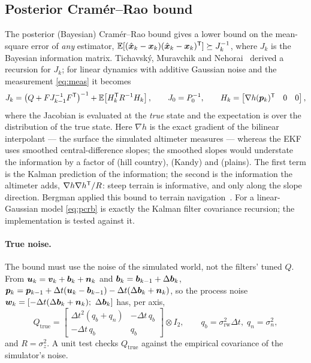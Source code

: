 \subsection{Posterior Cramér--Rao bound}\label{sec:pcrb}
The posterior (Bayesian) Cramér--Rao bound gives a lower bound on the mean-square error of
\emph{any} estimator, $\mathbb{E}[(\hat{\bm{x}}_k - \bm{x}_k)(\hat{\bm{x}}_k - \bm{x}_k)^{\mathsf{T}}] \succeq J_k^{-1}$, where $J_k$
is the Bayesian information matrix. Tichavsk\'y, Muravchik and Nehorai~\cite{tichavsky1998}
derived a recursion for $J_k$; for linear dynamics with additive Gaussian noise and the
measurement \eqref{eq:meas} it becomes
\begin{equation}
  J_k = \bigl(Q + F J_{k-1}^{-1} F^{\mathsf{T}}\bigr)^{-1} + \mathbb{E}\!\left[H_k^{\mathsf{T}} R^{-1} H_k\right],\qquad
  J_0 = P_0^{-1},\qquad H_k = \begin{bmatrix} \nabla h(\bm{p}_k)^{\mathsf{T}} & 0 & 0 \end{bmatrix},
  \label{eq:pcrb}
\end{equation}
where the Jacobian is evaluated at the \emph{true} state and the expectation is over the
distribution of the true state. Here $\nabla h$ is the exact gradient of the bilinear interpolant
--- the surface the simulated altimeter measures --- whereas the EKF uses smoothed
central-difference slopes; the smoothed slopes would understate the information by a factor of
\TerrHillGradRatio{} (hill country), \TerrKandyGradRatio{} (Kandy) and \TerrPlainsGradRatio{}
(plains). The first term is the Kalman prediction of the information; the
second is the information the altimeter adds, $\nabla h \nabla h^{\mathsf{T}} / R$: steep terrain is
informative, and only along the slope direction. Bergman applied this bound to terrain
navigation~\cite{bergman1999thesis}. For a linear-Gaussian model \eqref{eq:pcrb} is exactly the
Kalman filter covariance recursion; the implementation is tested against it.

\paragraph{True noise.} The bound must use the noise of the simulated world, not the filters'
tuned $Q$. From $\bm{u}_k = \bm{v}_k + \bm{b}_k + \bm{n}_k$ and
$\bm{b}_k = \bm{b}_{k-1} + \Delta\bm{b}_k$,
$\bm{p}_k = \bm{p}_{k-1} + \Delta t(\bm{u}_k - \bm{b}_{k-1}) - \Delta t(\Delta\bm{b}_k + \bm{n}_k)$, so the
process noise $\bm{w}_k = [-\Delta t(\Delta\bm{b}_k + \bm{n}_k);\ \Delta\bm{b}_k]$ has, per axis,
\begin{equation}
  Q_{\mathrm{true}} = \begin{bmatrix} \Delta t^2 (q_b + q_n) & -\Delta t\, q_b \\
                                      -\Delta t\, q_b & q_b \end{bmatrix}\otimes I_2,
  \qquad q_b = \sigma_{\mathrm{rw}}^2 \Delta t,\; q_n = \sigma_n^2,
\end{equation}
and $R = \sigma_z^2$. A unit test checks $Q_{\mathrm{true}}$ against the empirical covariance of
the simulator's noise.

